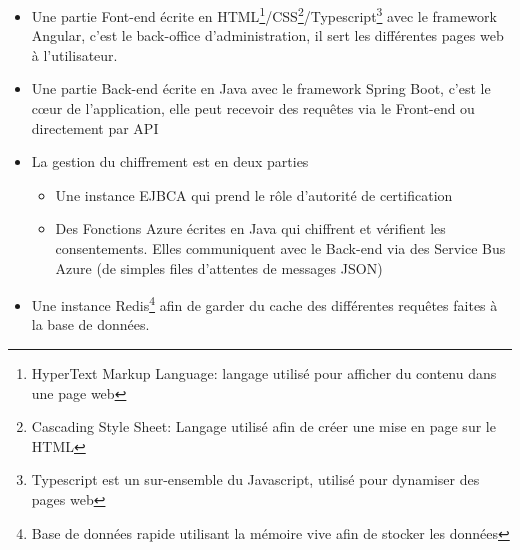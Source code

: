 \documentclass[12pt, a4paper]{report}
\begin{document}
\begin{itemize}
    \item Une partie Font-end écrite en HTML\footnote{HyperText Markup Language: langage utilisé pour afficher du contenu dans une page web}/CSS\footnote{Cascading Style Sheet: Langage utilisé afin de créer une mise en page sur le HTML}/Typescript\footnote{Typescript est un sur-ensemble du Javascript, utilisé pour dynamiser des pages web} avec le framework Angular, c'est le back-office d'administration, il sert les différentes pages web à l'utilisateur.
    \item Une partie Back-end écrite en Java avec le framework Spring Boot, c'est le cœur de l'application, elle peut recevoir des requêtes via le Front-end ou directement par API
    \item La gestion du chiffrement est en deux parties
        \begin{itemize}
            \item Une instance EJBCA qui prend le rôle d'autorité de certification
            \item Des Fonctions Azure écrites en Java qui chiffrent et vérifient les consentements. Elles communiquent avec le Back-end via des Service Bus Azure (de simples files d'attentes de messages JSON)
        \end{itemize}
    \item Une instance Redis\footnote{Base de données rapide utilisant la mémoire vive afin de stocker les données} afin de garder du cache des différentes requêtes faites à la base de données.
\end{itemize}
\end{document}
